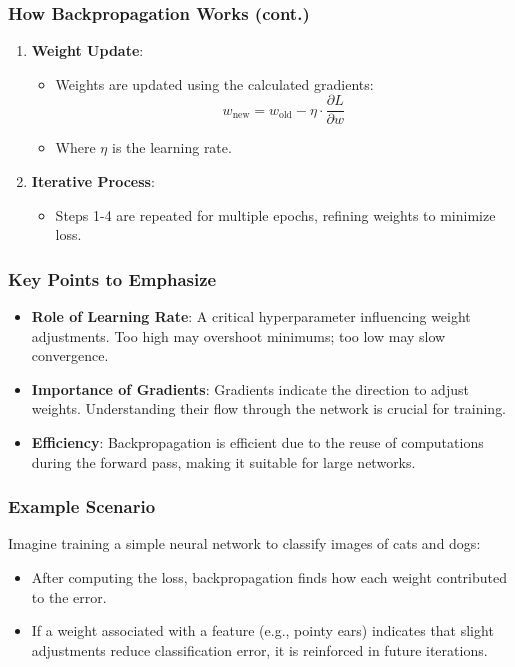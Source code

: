\documentclass[aspectratio=169]{beamer}
\begin{document}
\begin{frame}[fragile]
    \frametitle{How Backpropagation Works (cont.)}
    \begin{enumerate}[resume]
        \item \textbf{Weight Update}:
        \begin{itemize}
            \item Weights are updated using the calculated gradients:
            \begin{equation}
                w_{\text{new}} = w_{\text{old}} - \eta \cdot \frac{\partial L}{\partial w}
            \end{equation}
            \item Where \( \eta \) is the learning rate.
        \end{itemize}

        \item \textbf{Iterative Process}:
        \begin{itemize}
            \item Steps 1-4 are repeated for multiple epochs, refining weights to minimize loss.
        \end{itemize}
    \end{enumerate}
\end{frame}

\begin{frame}[fragile]
    \frametitle{Key Points to Emphasize}
    \begin{itemize}
        \item \textbf{Role of Learning Rate}:
        A critical hyperparameter influencing weight adjustments. Too high may overshoot minimums; too low may slow convergence.
        
        \item \textbf{Importance of Gradients}:
        Gradients indicate the direction to adjust weights. Understanding their flow through the network is crucial for training.
        
        \item \textbf{Efficiency}:
        Backpropagation is efficient due to the reuse of computations during the forward pass, making it suitable for large networks.
    \end{itemize}
\end{frame}

\begin{frame}[fragile]
    \frametitle{Example Scenario}
    Imagine training a simple neural network to classify images of cats and dogs:
    \begin{itemize}
        \item After computing the loss, backpropagation finds how each weight contributed to the error.
        \item If a weight associated with a feature (e.g., pointy ears) indicates that slight adjustments reduce classification error, it is reinforced in future iterations.
    \end{itemize}
\end{frame}
\end{document}
